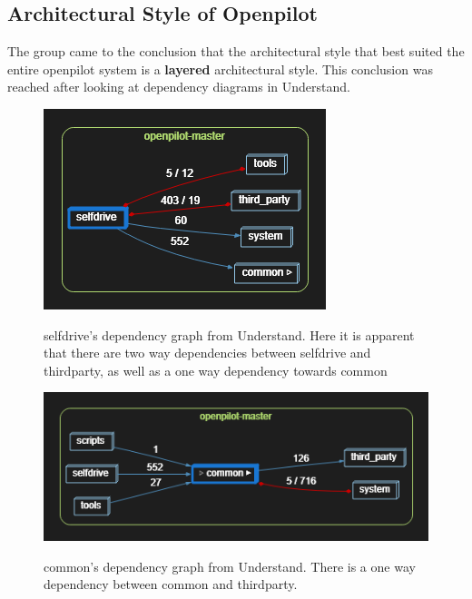 \documentclass[12pt]{article}
\begin{document}
\subsection{Architectural Style of Openpilot}

    The group came to the conclusion that the architectural style that best suited the entire openpilot system is a \textbf{layered} architectural style. This conclusion was reached after looking at dependency diagrams in Understand.


    \begin{figure}[H]
        \centering
        \includegraphics[scale=1]{Dependencies-selfdrive.png}\\
        \caption{selfdrive's dependency graph from Understand. Here it is apparent that there are two way dependencies between selfdrive and third\textunderscore party, as well as a one way dependency towards common}
        \label{fig:enter-label}
    \end{figure}

    \begin{figure}[H]
        \centering
        \includegraphics[scale=1]{Dependencies-common.png}\\
        \caption{common's dependency graph from Understand. There is a one way dependency between common and third\textunderscore party.}
        \label{fig:enter-label}
    \end{figure}
\end{document}
